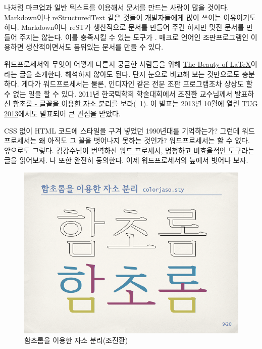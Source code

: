 \documentclass[oneside, chapter, 11pt]{oblivoir}
\begin{document}
나처럼 마크업과 일반 텍스트를 이용해서 문서를 만드는 사람이 많을 것이다. Markdown이나 reStructuredText 같은 것들이 개발자들에게 많이 쓰이는 이유이기도 하다. Markdown이나 reST가 생산적으로 문서를 만들어 주긴 하지만 멋진 문서를 만들어 주지는 않는다. 이를 충족시킬 수 있는 도구가 . 매크로 언어인  조판프로그램인  이용하면 생산적이면서도 품위있는 문서를 만들 수 있다. 

워드프로세서와 무엇이 어떻게 다른지 궁금한 사람들을 위해 \href{http://nitens.org/taraborelli/latex}{The Beauty of \LaTeX}이라는 글을 소개한다. 해석하지 않아도 된다. 단지 눈으로 비교해 보는 것만으로도 충분하다. 게다가 워드프로세서는 물론, 인디자인 같은 전문 조판 프로그램조차 상상도 할 수 없는 일을 할 수 있다. 2011년 한국텍학회 학술대회에서 조진환 교수님께서 발표하신 \href{http://conf.ktug.org/2011/Program_files/KTS2011-chof.pdf}{함초롬 - 글꼴을 이용한 자소 분리}를 보라(\figurename~\ref{fig:hcr}). 이 발표는 2013년 10월에 열린 \href{http://tug.org/tug2013/}{TUG 2013}에서도 발표되어 큰 관심을 받았다.

CSS 없이 HTML 코드에 스타일을 구겨 넣었던 1990년대를 기억하는가? 그런데 워드프로세서는 왜 아직도 그 꼴을 벗어나지 못하는 것인가? 워드프로세서는 할 수 없다. 앞으로도 그렇다. 김강수님이 번역하신 \href{https://www.dropbox.com/s/fjmszvq6f05dlxg/wpkor.pdf}{워드 프로세서, 멍청하고 비효율적인 도구}라는 글을 읽어보자. 나 또한 완전히 동의한다. 이제 워드프로세서의 늪에서 벗어나 보자.

\begin{figure}[!hbtp]
\caption{함초롬을 이용한 자소 분리(조진환)}
\label{fig:hcr}
\includegraphics[width=\textwidth]{KTS2011-chof}
\end{figure}
\end{document}
